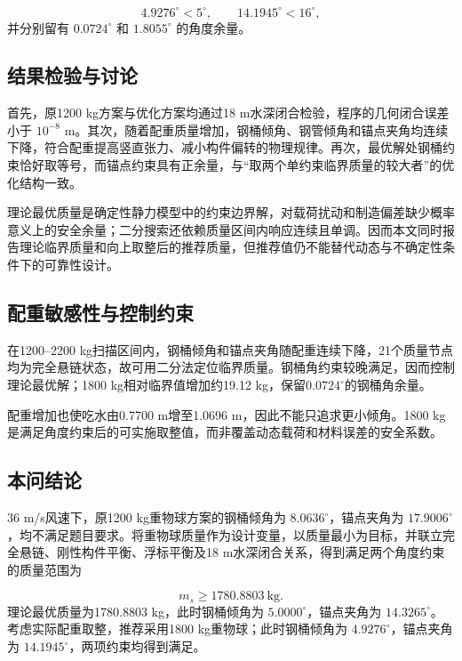 \[
4.9276^\circ<5^\circ,
\qquad
14.1945^\circ<16^\circ,
\]
并分别留有 \(0.0724^\circ\) 和 \(1.8055^\circ\) 的角度余量。

\subsection{结果检验与讨论}
首先，原1200 kg方案与优化方案均通过18 m水深闭合检验，程序的几何闭合误差小于 \(10^{-8}\) m。其次，随着配重质量增加，钢桶倾角、钢管倾角和锚点夹角均连续下降，符合配重提高竖直张力、减小构件偏转的物理规律。再次，最优解处钢桶约束恰好取等号，而锚点约束具有正余量，与“取两个单约束临界质量的较大者”的优化结构一致。

理论最优质量是确定性静力模型中的约束边界解，对载荷扰动和制造偏差缺少概率意义上的安全余量；二分搜索还依赖质量区间内响应连续且单调。因而本文同时报告理论临界质量和向上取整后的推荐质量，但推荐值仍不能替代动态与不确定性条件下的可靠性设计。

\subsection{配重敏感性与控制约束}
在1200--2200 kg扫描区间内，钢桶倾角和锚点夹角随配重连续下降，21个质量节点均为完全悬链状态，故可用二分法定位临界质量。钢桶角约束较晚满足，因而控制理论最优解；1800 kg相对临界值增加约19.12 kg，保留$0.0724^\circ$的钢桶角余量。

配重增加也使吃水由0.7700 m增至1.0696 m，因此不能只追求更小倾角。1800 kg是满足角度约束后的可实施取整值，而非覆盖动态载荷和材料误差的安全系数。

\subsection{本问结论}
36 m/s风速下，原1200 kg重物球方案的钢桶倾角为 \(8.0636^\circ\)，锚点夹角为 \(17.9006^\circ\)，均不满足题目要求。将重物球质量作为设计变量，以质量最小为目标，并联立完全悬链、刚性构件平衡、浮标平衡及18 m水深闭合关系，得到满足两个角度约束的质量范围为

\[
\boxed{m_s\ge1780.8803\ \mathrm{kg}}.
\]
理论最优质量为1780.8803 kg，此时钢桶倾角为 \(5.0000^\circ\)，锚点夹角为 \(14.3265^\circ\)。考虑实际配重取整，推荐采用1800 kg重物球；此时钢桶倾角为 \(4.9276^\circ\)，锚点夹角为 \(14.1945^\circ\)，两项约束均得到满足。
